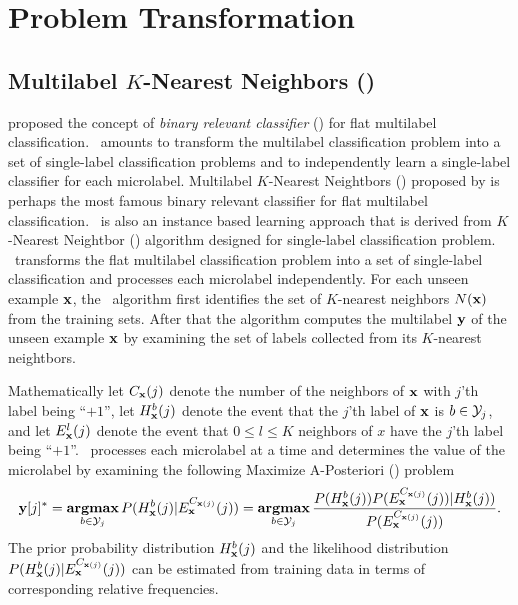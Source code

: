 {%
%
\section{Problem Transformation}


%
%
\subsection{Multilabel $K$-Nearest Neighbors (\mlknn)} \label{sc_mlknn}

\citet{Tsoumakas07multi,Tsoumakas10mining} proposed the concept of \textit{binary relevant classifier} (\br) for flat multilabel classification.
\br\ amounts to transform the multilabel classification problem into a set of single-label classification problems and to independently learn a single-label classifier for each microlabel.
Multilabel $K$-Nearest Neightbors (\mlknn) proposed by \citet{Zhang05a,Zhang07mlknn} is perhaps the most famous binary relevant classifier for flat multilabel classification.
\mlknn\ is also an instance based learning approach \citep{Aha91instance} that is derived from $K$-Nearest Neightbor (\knn) algorithm designed for single-label classification problem.
\mlknn\ transforms the flat multilabel classification problem into a set of single-label classification and processes each microlabel independently.
For each unseen example $\mathbf {x}$, the \mlknn\ algorithm first identifies the set of $K$-nearest neighbors $N(\mathbf {x})$ from the training sets.
After that the algorithm computes the multilabel $\mathbf {y}$ of the unseen example $\mathbf {x}$ by examining the set of labels collected from its $K$-nearest neightbors.

Mathematically 
let $C_{\mathbf {x}}(j)$ denote the number of the neighbors of $\mathbf {x}$ with $j$'th label being ``$+1$'',
let $H^b_{\mathbf {x}}(j)$ denote the event that the $j$'th label of $\mathbf {x}$ is $b\in\mathcal{Y}_j$,
and let $E_{\mathbf {x}}^l(j)$ denote the event that $0\le l \le K$ neighbors of $x$ have the $j$'th label being ``$+1$''.
\mlknn\ processes each microlabel at a time and determines the value of the microlabel by examining the following Maximize A-Posteriori (\map) problem
\begin{align*}
	\mathbf {y}[j]^* = \underset{b\in\mathcal{Y}_j}{\textbf{argmax}} \, P( H^b_{\mathbf {x}}(j) | E_{\mathbf {x}}^{C_{\mathbf {x}(j)}}(j) )
	= \underset{b\in\mathcal{Y}_j}{\textbf{argmax}} \, \frac{P( H^b_{\mathbf {x}}(j) ) P(  E_{\mathbf {x}}^{C_{\mathbf {x}(j)}}(j) ) | H^b_{\mathbf {x}}(j))}{P( E_{\mathbf {x}}^{C_{\mathbf {x}(j)}}(j))}.
\end{align*}
The prior probability distribution $H^b_{\mathbf {x}}(j)$ and the likelihood distribution $P( H^b_{\mathbf {x}}(j) | E_{\mathbf {x}}^{C_{\mathbf {x}(j)}}(j) )$ can be estimated from training data in terms of corresponding relative frequencies.

}
